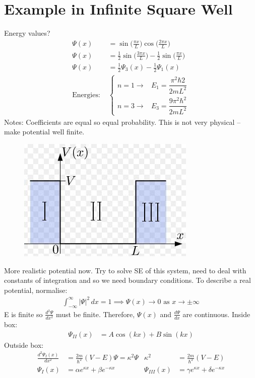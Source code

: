 \documentclass[a4paper, 11pt, normalem]{report}
\begin{document}
\section{Example in Infinite Square Well}
Energy values?
\begin{align}
    \Psi(x) &= \sin\Big(\frac{\pi x}{L}\Big)\cos\Big(\frac{2\pi x}{L}\Big) \\
    \Psi(x) &= \frac{1}{2}\sin\Big(\frac{3\pi x}{L}\Big) - \frac{1}{2}\sin\Big(\frac{\pi x}{L}\Big) \\
    \Psi(x) &= \frac{1}{2}\Psi_{3}(x) - \frac{1}{2}\Psi_{1}(x) \\
    \text{Energies: }&
    \begin{cases}
        n = 1 \rightarrow& E_{1} = \dfrac{\pi^{2}\hbar{2}}{2mL^{2}} \\
        n = 3 \rightarrow& E_{3} = \dfrac{9\pi^{2}\hbar^{2}}{2mL^{2}}
    \end{cases}
\end{align}
Notes: Coefficients are equal so equal probability.
This is not very physical -- make potential well finite.
\begin{figure}[H]
    \centering
    \includegraphics{Finite.jpg}
\end{figure}
More realistic potential now.
Try to solve SE of this system, need to deal with constants of integration and so we need boundary conditions.
To describe a real potential, normalise:
\begin{align}
    \int_{-\infty}^{\infty} |\Psi|^{2}\,dx = 1 \implies \Psi(x) \rightarrow 0 \text{ as } x \rightarrow \pm\infty
\end{align}
E is finite so $\frac{d^{2}\Psi}{dx^{2}}$ must be finite.
Therefore, $\Psi(x)$ and $\frac{d\Psi}{dx}$ are continuous.
Inside box:
\begin{align}
    \Psi_{II}(x) &= A\cos(kx) + B\sin(kx)
\end{align}
Outside box:
\begin{align}
    \frac{d^{2}\Psi_{I}(x)}{dx^{2}} &= \frac{2m}{\hbar^{2}}(V - E)\Psi = \kappa^{2}\Psi & \kappa^{2} &= \frac{2m}{\hbar^{2}}(V -E) \\
    \Psi_{I}(x) &= \alpha e^{\kappa x} + \beta e^{-\kappa x} & \Psi_{III}(x) &= \gamma e^{\kappa x} + \delta e^{-\kappa x}
\end{align}
\end{document}
